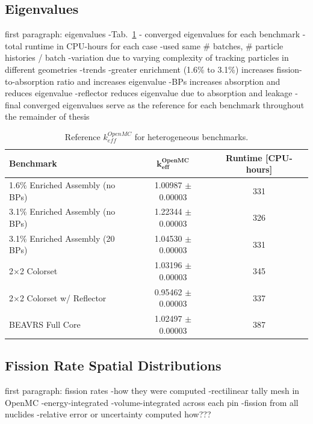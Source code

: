 \subsection{Eigenvalues}
\label{subsec:chap7-eigenvalues}

first paragraph: eigenvalues
-Tab.~\ref{table:chap7-ref-eigenvalues} - converged eigenvalues for each benchmark
-total runtime in CPU-hours for each case
  -used same \# batches, \# particle histories / batch
  -variation due to varying complexity of tracking particles in different geometries
-trends
  -greater enrichment (1.6\% to 3.1\%) increases fission-to-absorption ratio and increases eigenvalue
  -\ac{BP}s increases absorption and reduces eigenvalue
  -reflector reduces eigenvalue due to absorption and leakage
-final converged eigenvalues serve as the reference for each benchmark throughout the remainder of thesis

\begin{table}[h!]
  \centering
  \caption[Reference $k^{OpenMC}_{eff}$ for heterogeneous benchmarks]{Reference $k^{OpenMC}_{eff}$ for heterogeneous benchmarks.}
  \small
  \label{table:chap7-ref-eigenvalues}
  \vspace{6pt}
  \begin{tabular}{l c c}
  \toprule
  \textbf{Benchmark} & $\mathbf{k^{OpenMC}_{eff}}$ & \textbf{Runtime [CPU-hours]} \\
  \midrule
  1.6\% Enriched Assembly (no \ac{BP}s) & 1.00987 $\pm$ 0.00003 & 331 \\
  3.1\% Enriched Assembly (no \ac{BP}s) & 1.22344 $\pm$ 0.00003 & 326 \\
  3.1\% Enriched Assembly (20 \ac{BP}s) & 1.04530 $\pm$ 0.00003 & 331 \\
  2$\times$2 Colorset & 1.03196 $\pm$ 0.00003 & 345 \\
  2$\times$2 Colorset w/ Reflector & 0.95462 $\pm$ 0.00003 & 337 \\
  \ac{BEAVRS} Full Core & 1.02497 $\pm$ 0.00003 & 387 \\
  \bottomrule
\end{tabular}
\end{table}

\subsection{Fission Rate Spatial Distributions}
\label{subsec:chap7-pin-powers}

first paragraph: fission rates
-how they were computed 
  -rectilinear tally mesh in OpenMC
  -energy-integrated
  -volume-integrated across each pin
  -fission from all nuclides
-relative error or uncertainty computed how???

